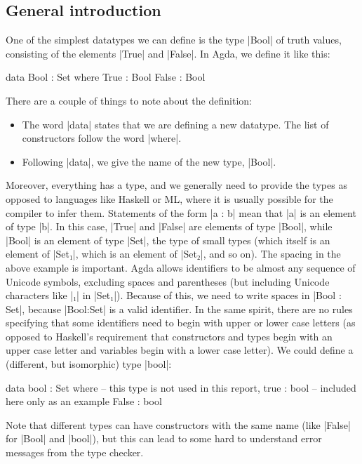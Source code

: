 \subsection{General introduction}
\label{General-intro}
One of the simplest datatypes we can define is the type |Bool| of truth values, consisting of the elements |True| and |False|. In Agda, we define it like this:
\begin{code}
data Bool : Set where
  True   : Bool
  False  : Bool
\end{code}
There are a couple of things to note about the definition:
\begin{itemize}
\item The word |data| states that we are defining a new datatype. The list of constructors follow the word |where|. 
\item Following |data|, we give the name of the new type, |Bool|.
\end{itemize}
Moreover, everything has a type, and we generally need to provide the types as opposed to languages like Haskell or ML, where it is usually possible for the compiler to infer them. Statements of the form |a : b| mean that |a| is an element of type |b|. In this case, |True| and |False| are elements of type |Bool|, while |Bool| is an element of type |Set|, the type of small types (which itself is an element of |Set₁|, which is an element of |Set₂|, and so on).
The spacing in the above example is important. Agda allows identifiers to be almost any sequence of Unicode symbols, excluding spaces and parentheses (but including Unicode characters like |₁| in |Set₁|). Because of this, we need to write spaces in |Bool : Set|, because |Bool:Set| is a valid identifier. In the same spirit, there are no rules specifying that some identifiers need to begin with upper or lower case letters (as opposed to Haskell's requirement that constructors and types begin with an upper case letter and variables begin with a lower case letter). We could define a (different, but isomorphic) type |bool|:
\begin{code}
data bool : Set where   -- this type is not used in this report,
  true   : bool         -- included here only as an example
  False  : bool
\end{code}
Note that different types can have constructors with the same name (like |False| for |Bool| and |bool|), but this can lead to some hard to understand error messages from the type checker.

